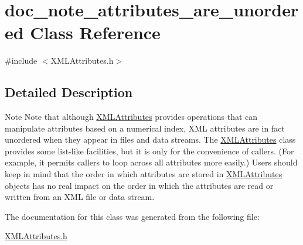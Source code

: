 \hypertarget{classdoc__note__attributes__are__unordered}{}\section{doc\+\_\+note\+\_\+attributes\+\_\+are\+\_\+unordered Class Reference}
\label{classdoc__note__attributes__are__unordered}


{\ttfamily \#include $<$X\+M\+L\+Attributes.\+h$>$}



\subsection{Detailed Description}
\begin{DoxyNote}{Note}
Note that although \hyperlink{class_x_m_l_attributes}{X\+M\+L\+Attributes} provides operations that can manipulate attributes based on a numerical index, X\+ML attributes are in fact unordered when they appear in files and data streams. The \hyperlink{class_x_m_l_attributes}{X\+M\+L\+Attributes} class provides some list-\/like facilities, but it is only for the convenience of callers. (For example, it permits callers to loop across all attributes more easily.) Users should keep in mind that the order in which attributes are stored in \hyperlink{class_x_m_l_attributes}{X\+M\+L\+Attributes} objects has no real impact on the order in which the attributes are read or written from an X\+ML file or data stream. 
\end{DoxyNote}


The documentation for this class was generated from the following file\+:\begin{DoxyCompactItemize}
\item 
\hyperlink{_x_m_l_attributes_8h}{X\+M\+L\+Attributes.\+h}\end{DoxyCompactItemize}
